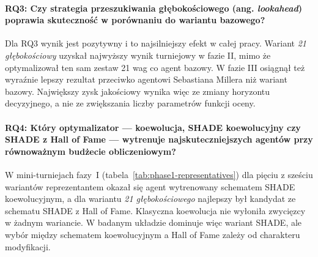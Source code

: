\paragraph{RQ3: Czy strategia przeszukiwania głębokościowego (ang. \textit{lookahead}) poprawia skuteczność w porównaniu do wariantu bazowego?}
Dla RQ3 wynik jest pozytywny i to najsilniejszy efekt w całej pracy. Wariant \textit{21 głębokościowy} uzyskał najwyższy wynik turniejowy w fazie II, mimo że optymalizował ten sam zestaw 21 wag co agent bazowy. W fazie III osiągnął też wyraźnie lepszy rezultat przeciwko agentowi Sebastiana Millera niż wariant bazowy. Największy zysk jakościowy wynika więc ze zmiany horyzontu decyzyjnego, a nie ze zwiększania liczby parametrów funkcji oceny.

\paragraph{RQ4: Który optymalizator --- koewolucja, SHADE koewolucyjny czy SHADE z Hall of Fame --- wytrenuje najskuteczniejszych agentów przy równoważnym budżecie obliczeniowym?}
W mini-turniejach fazy~I (tabela~\ref{tab:phase1-representatives}) dla pięciu z sześciu wariantów reprezentantem okazał się agent wytrenowany schematem SHADE koewolucyjnym, a dla wariantu \textit{21 głębokościowego} najlepszy był kandydat ze schematu SHADE z Hall of Fame. Klasyczna koewolucja nie wyłoniła zwycięzcy w żadnym wariancie. W badanym układzie dominuje więc wariant SHADE, ale wybór między schematem koewolucyjnym a Hall of Fame zależy od charakteru modyfikacji.

